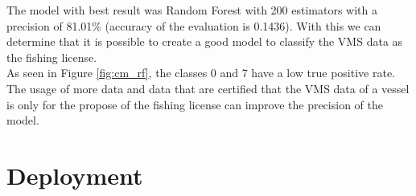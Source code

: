 \newpage
The model with best result was Random Forest with 200 estimators with a precision of 81.01\% (accuracy of the evaluation is 0.1436).
With this we can determine that it is possible to create a good model to classify the VMS data as the fishing license. \\
As seen in Figure \ref{fig:cm_rf}, the classes 0 and 7 have a low true positive rate. The usage of more data and data that are certified that the VMS data of a vessel is only for the propose of the fishing license can improve the precision of the model.





\section{Deployment} %
\label{sub:deployment}







